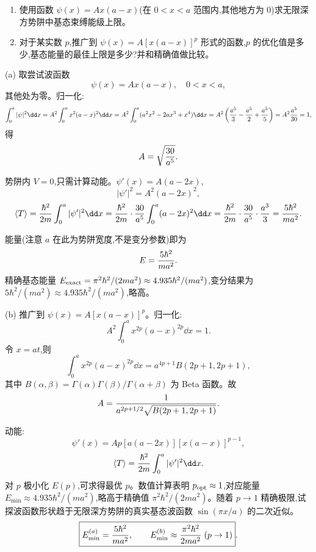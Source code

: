 \begin{question}
\begin{enumerate}
\item 使用函数 $\psi(x)=Ax(a-x)$(在 $0<x<a$ 范围内,其他地方为 0)求无限深方势阱中基态束缚能级上限。
\item 对于某实数 $p$,推广到 $\psi(x)=A[x(a-x)]^p$ 形式的函数,$p$ 的优化值是多少,基态能量的最佳上限是多少?并和精确值做比较。
\end{enumerate}
\begin{solution}
(a) 取尝试波函数
\[
\psi(x)=A x(a-x),\quad 0<x<a,
\]
其他处为零。归一化:
\[
\int_0^a|\psi|^2\dd x=A^2\int_0^a x^2(a-x)^2\dd x
=A^2\int_0^a (a^2x^2-2ax^3+x^4)\dd x
=A^2\left({a^5\over3}-{a^5\over2}+{a^5\over5}\right)
=A^2{a^5\over30}=1,
\]
得
\[
A=\sqrt{30\over a^5}.
\]

势阱内 $V=0$,只需计算动能。$\psi'(x)=A(a-2x)$,
\[
|\psi'|^2=A^2(a-2x)^2,
\]
\[
\langle T\rangle={\hbar^2\over2m}\int_0^a|\psi'|^2\dd x
={\hbar^2\over2m}\cdot{30\over a^5}\int_0^a (a-2x)^2\dd x
={\hbar^2\over2m}\cdot{30\over a^5}\cdot{a^3\over3}
={5\hbar^2\over ma^2}.
\]

能量(注意 $a$ 在此为势阱宽度,不是变分参数)即为
\[
E={5\hbar^2\over ma^2}.
\]
精确基态能量 $E_{\rm exact}=\pi^2\hbar^2/(2ma^2)\approx4.935\hbar^2/(ma^2)$,变分结果为 $5\hbar^2/(ma^2)\approx4.935\hbar^2/(ma^2)$,略高。

(b) 推广到 $\psi(x)=A[x(a-x)]^p$。归一化:
\[
A^2\int_0^a x^{2p}(a-x)^{2p}\dd x=1.
\]
令 $x=at$,则
\[
\int_0^a x^{2p}(a-x)^{2p}\dd x=a^{4p+1}B(2p+1,2p+1),
\]
其中 $B(\alpha,\beta)=\Gamma(\alpha)\Gamma(\beta)/\Gamma(\alpha+\beta)$ 为 Beta 函数。故
\[
A={1\over a^{2p+1/2}\sqrt{B(2p+1,2p+1)}}.
\]

动能:
\[
\psi'(x)=Ap[a(a-2x)][x(a-x)]^{p-1},
\]
\[
\langle T\rangle={\hbar^2\over2m}\int_0^a|\psi'|^2\dd x.
\]
对 $p$ 极小化 $E(p)$,可求得最优 $p$。数值计算表明 $p_{\rm opt}\approx1$,对应能量 $E_{\min}\approx4.935\hbar^2/(ma^2)$,略高于精确值 $\pi^2\hbar^2/(2ma^2)$。随着 $p\to1$ 精确极限,试探波函数形状趋于无限深方势阱的真实基态波函数 $\sin(\pi x/a)$ 的二次近似。
\[
\boxed{E_{\min}^{(a)}={5\hbar^2\over ma^2},\qquad E_{\min}^{(b)}\approx{\pi^2\hbar^2\over2ma^2}\;(p\to1)}.
\]
\end{solution}
\end{question}


